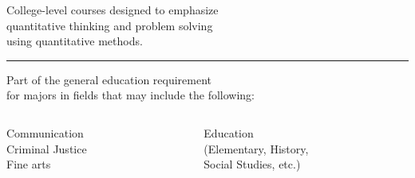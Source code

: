 \documentclass[14pt]{beamer}
\newcounter{a}
\newcounter{b}
\begin{document}
\begin{frame}[nofills]

  College-level courses designed to emphasize \\
  \quad quantitative thinking and problem solving \\
  \quad using quantitative methods.

  \vfill
  \hrule
  \vfill

  Part of the general education requirement \\
  \quad for majors in fields that may include the following: \\[-2ex]
  \begin{columns}
    \color{dark}
    \begin{column}{0.5\textwidth}
      \begin{center}
        Communication \\
        Criminal Justice \\
        Fine arts
        \end{center}
    \end{column}
    \begin{column}{0.65\textwidth}
      \begin{center}
        Education \footnotesize\\
        (Elementary, History, \\
        Social Studies, etc.)
        \end{center}
    \end{column}
  \end{columns}

  \vfill

\end{frame}
\end{document}
